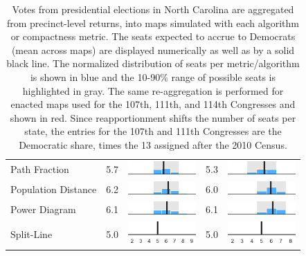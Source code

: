 \begin{table}
\begin{tabular}{l rm{7em} rm{7em}}
Path Fraction          &   5.7 &    \includegraphics[width=7em]{mini_hist/NC_2012_path_frac} &   5.3 &    \includegraphics[width=7em]{mini_hist/NC_2016_path_frac} \\
Population Distance    &   6.2 &       \includegraphics[width=7em]{mini_hist/NC_2012_dist_p} &   6.0 &       \includegraphics[width=7em]{mini_hist/NC_2016_dist_p} \\
Power Diagram          &   6.1 &        \includegraphics[width=7em]{mini_hist/NC_2012_power} &   6.1 &        \includegraphics[width=7em]{mini_hist/NC_2016_power} \\
Split-Line             &   5.0 &        \includegraphics[width=7em]{mini_hist/NC_2012_split_ax} &   5.0 &        \includegraphics[width=7em]{mini_hist/NC_2016_split_ax} \\
\hline \hline
\end{tabular}
\caption{Votes from presidential elections in North Carolina are aggregated from precinct-level returns, into maps simulated with each algorithm or compactness metric. 
             The seats expected to accrue to Democrats (mean across maps) are displayed numerically as well as by a solid black line.
             The normalized distribution of seats per metric/algorithm is shown in blue and the 10-90\% range of possible seats is highlighted in gray.
             The same re-aggregation is performed for enacted maps used for the 107th, 111th, and 114th Congresses and shown in red.
             Since reapportionment shifts the number of seats per state,
               the entries for the 107th and 111th Congresses are the Democratic share,
               times the 13 assigned after the 2010 Census.
             }\label{tab:NC_seats}
\end{table}
 